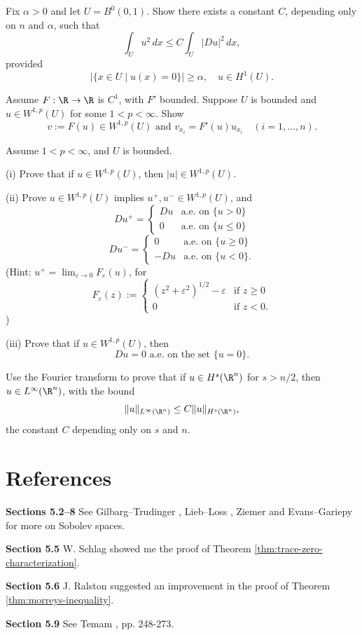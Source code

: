 \begin{exercise}
Fix $\alpha > 0$ and let $U = B^0(0,1)$. Show there exists a constant $C$, depending only on $n$ and $\alpha$, such that
$$\int_U u^2\,dx \le C \int_U |Du|^2\,dx,$$
provided
$$|\{x \in U \mid u(x) = 0\}| \ge \alpha, \quad u \in H^1(U).$$
\end{exercise}

\begin{exercise}
Assume $F : \R \to \R$ is $C^1$, with $F'$ bounded. Suppose $U$ is bounded and $u \in W^{1,p}(U)$ for some $1 < p < \infty$. Show
$$v := F(u) \in W^{1,p}(U) \text{ and } v_{x_i} = F'(u) u_{x_i} \quad (i = 1, \ldots, n).$$
\end{exercise}

\begin{exercise}
Assume $1 < p < \infty$, and $U$ is bounded.

(i) Prove that if $u \in W^{1,p}(U)$, then $|u| \in W^{1,p}(U)$.

(ii) Prove $u \in W^{1,p}(U)$ implies $u^+, u^- \in W^{1,p}(U)$, and
$$Du^+ = \begin{cases} Du & \text{a.e. on } \{u > 0\} \\ 0 & \text{a.e. on } \{u \le 0\} \end{cases}$$
$$Du^- = \begin{cases} 0 & \text{a.e. on } \{u \ge 0\} \\ -Du & \text{a.e. on } \{u < 0\}. \end{cases}$$
(Hint: $u^+ = \lim_{\varepsilon \to 0} F_\varepsilon(u)$, for
$$F_\varepsilon(z) := \begin{cases} (z^2 + \varepsilon^2)^{1/2} - \varepsilon & \text{if } z \ge 0 \\ 0 & \text{if } z < 0. \end{cases}$$
)

(iii) Prove that if $u \in W^{1,p}(U)$, then
$$Du = 0 \text{ a.e. on the set } \{u = 0\}.$$
\end{exercise}

\begin{exercise}
Use the Fourier transform to prove that if $u \in H^s(\R^n)$ for $s > n/2$, then $u \in L^\infty(\R^n)$, with the bound
$$\|u\|_{L^\infty(\R^n)} \le C\|u\|_{H^s(\R^n)},$$
the constant $C$ depending only on $s$ and $n$.
\end{exercise}

\section{References}
\label{sec:sobolev-references}

\textbf{Sections 5.2--8} See Gilbarg--Trudinger \cite{GilbargTrudinger1983}, Lieb--Loss \cite{LiebLoss1997}, Ziemer \cite{Ziemer1989} and Evans--Gariepy \cite{EvansGariepy1992} for more on Sobolev spaces.

\textbf{Section 5.5} W. Schlag showed me the proof of Theorem \ref{thm:trace-zero-characterization}.

\textbf{Section 5.6} J. Ralston suggested an improvement in the proof of Theorem \ref{thm:morreys-inequality}.

\textbf{Section 5.9} See Temam \cite{Temam1977}, pp. 248-273.
